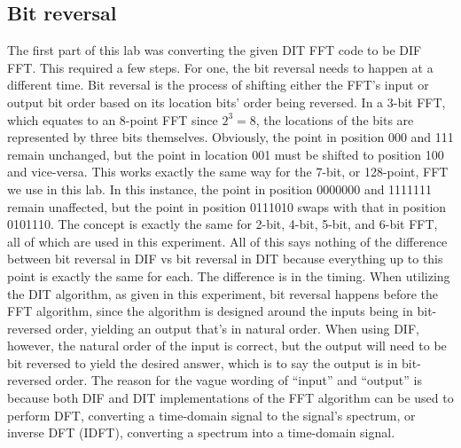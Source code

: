 \documentclass{bannerReport}
\begin{document}
\subsection{Bit reversal}
The first part of this lab was converting the given DIT FFT code to be DIF FFT. This required a few steps. For one, the bit reversal needs to happen at a different time. Bit reversal is the process of shifting either the FFT’s input or output bit order based on its location bits’ order being reversed. In a 3-bit FFT, which equates to an 8-point FFT since $2^3 = 8$, the locations of the bits are represented by three bits themselves. Obviously, the point in position 000 and 111 remain unchanged, but the point in location 001 must be shifted to position 100 and vice-versa. This works exactly the same way for the 7-bit, or 128-point, FFT we use in this lab. In this instance, the point in position 0000000 and 1111111 remain unaffected, but the point in position 0111010 swaps with that in position 0101110. The concept is exactly the same for 2-bit, 4-bit, 5-bit, and 6-bit FFT, all of which are used in this experiment. All of this says nothing of the difference between bit reversal in DIF vs bit reversal in DIT because everything up to this point is exactly the same for each. The difference is in the timing. When utilizing the DIT algorithm, as given in this experiment, bit reversal happens before the FFT algorithm, since the algorithm is designed around the inputs being in bit-reversed order, yielding an output that’s in natural order. When using DIF, however, the natural order of the input is correct, but the output will need to be bit reversed to yield the desired answer, which is to say the output is in bit-reversed order. The reason for the vague wording of “input” and “output” is because both DIF and DIT implementations of the FFT algorithm can be used to perform DFT, converting a time-domain signal to the signal’s spectrum, or inverse DFT (IDFT), converting a spectrum into a time-domain signal. 
\end{document}
